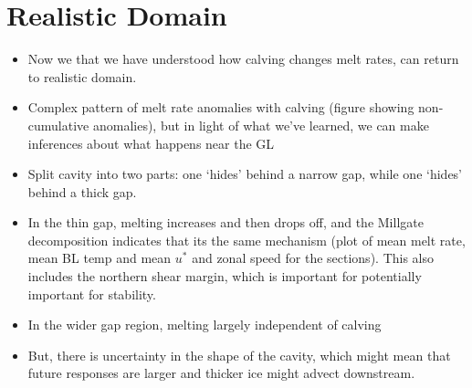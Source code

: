 \documentclass[draft]{agujournal2019}
\begin{document}
\section{Realistic Domain}
\begin{itemize}
    \item Now we that we have understood how calving changes melt rates, can return to realistic domain.
    \item Complex pattern of melt rate anomalies with calving (figure showing non-cumulative anomalies), but in light of what we've learned, we can make inferences about what happens near the GL
    \item Split cavity into two parts: one `hides' behind a narrow gap, while one `hides' behind a thick gap. 
    \item In the thin gap, melting increases and then drops off, and the Millgate decomposition indicates that its the same mechanism (plot of mean melt rate, mean BL temp and mean $u^*$ and zonal speed for the sections). This also includes the northern shear margin, which is important for potentially important for stability.
    \item In the wider gap region, melting largely independent of calving 
    \item But, there is uncertainty in the shape of the cavity, which might mean that future responses are larger and thicker ice might advect downstream. 
\end{itemize}
\end{document}
